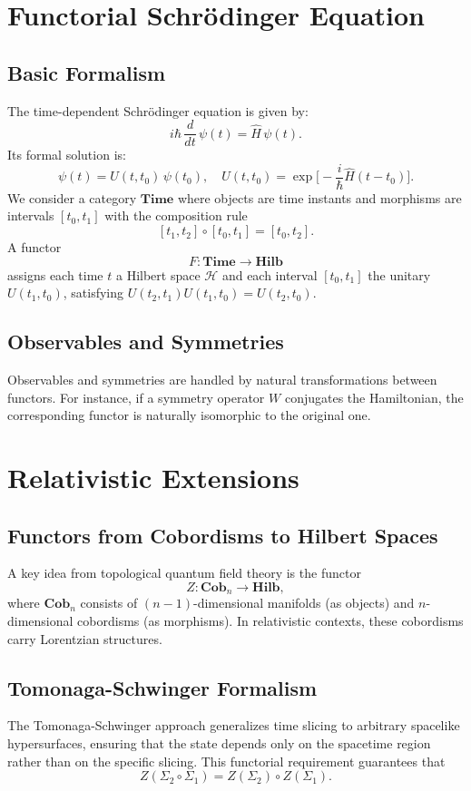 \documentclass[12pt]{article}
\begin{document}
\section{Functorial Schrödinger Equation}
\subsection{Basic Formalism}
The time-dependent Schrödinger equation is given by:
\[
i\hbar \,\frac{d}{dt}\,\psi(t) = \hat{H}\,\psi(t).
\]
Its formal solution is:
\[
\psi(t) = U(t,t_0)\,\psi(t_0), \quad U(t,t_0)=\exp\!\Big[-\frac{i}{\hbar}\hat{H}(t-t_0)\Big].
\]
We consider a category \(\mathbf{Time}\) where objects are time instants and morphisms are intervals \([t_0,t_1]\) with the composition rule
\[
[t_1,t_2]\circ[t_0,t_1]=[t_0,t_2].
\]
A functor
\[
F:\mathbf{Time}\to\mathbf{Hilb}
\]
assigns each time \(t\) a Hilbert space \(\mathcal{H}\) and each interval \([t_0,t_1]\) the unitary \(U(t_1,t_0)\), satisfying \(U(t_2,t_1)U(t_1,t_0)=U(t_2,t_0)\).

\subsection{Observables and Symmetries}
Observables and symmetries are handled by natural transformations between functors. For instance, if a symmetry operator \(W\) conjugates the Hamiltonian, the corresponding functor is naturally isomorphic to the original one.

\section{Relativistic Extensions}
\subsection{Functors from Cobordisms to Hilbert Spaces}
A key idea from topological quantum field theory is the functor
\[
Z:\mathbf{Cob}_n\to\mathbf{Hilb},
\]
where \(\mathbf{Cob}_n\) consists of \((n-1)\)-dimensional manifolds (as objects) and \(n\)-dimensional cobordisms (as morphisms). In relativistic contexts, these cobordisms carry Lorentzian structures.

\subsection{Tomonaga-Schwinger Formalism}
The Tomonaga-Schwinger approach generalizes time slicing to arbitrary spacelike hypersurfaces, ensuring that the state depends only on the spacetime region rather than on the specific slicing. This functorial requirement guarantees that
\[
Z(\Sigma_2\circ\Sigma_1)=Z(\Sigma_2)\circ Z(\Sigma_1).
\]
\end{document}
